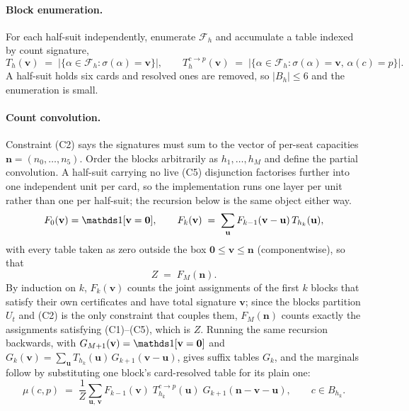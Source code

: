 \paragraph{Block enumeration.} For each half-suit independently, enumerate $\mathcal{F}_h$
and accumulate a table indexed by count signature,
\begin{equation}
  T_h(\mathbf{v}) \;=\; \bigl|\{\alpha \in \mathcal{F}_h : \sigma(\alpha) = \mathbf{v}\}\bigr|,
  \qquad
  T_h^{c \to p}(\mathbf{v}) \;=\; \bigl|\{\alpha \in \mathcal{F}_h : \sigma(\alpha) = \mathbf{v},\,
  \alpha(c) = p\}\bigr|.
  \label{eq:blocktable}
\end{equation}
A half-suit holds six cards and resolved ones are removed, so $|B_h| \le 6$ and the enumeration is
small.

\paragraph{Count convolution.} Constraint (C2) says the signatures must sum to the vector of
per-seat capacities $\mathbf{n} = (n_0,\dots,n_5)$. Order the blocks arbitrarily as $h_1, \dots,
h_M$ and define the partial convolution. A half-suit carrying no live (C5) disjunction factorises
further into one independent unit per card, so the implementation runs one layer per unit rather
than one per half-suit; the recursion below is the same object either way.
\begin{equation}
  F_0(\mathbf{v}) = \ind[\mathbf{v} = \mathbf{0}], \qquad
  F_k(\mathbf{v}) \;=\; \sum_{\mathbf{u}} F_{k-1}(\mathbf{v}-\mathbf{u})\, T_{h_k}(\mathbf{u}),
  \label{eq:dp}
\end{equation}
with every table taken as zero outside the box $\mathbf{0} \le \mathbf{v} \le \mathbf{n}$
(componentwise), so that
\begin{equation}
  Z \;=\; F_M(\mathbf{n}).
  \label{eq:Z}
\end{equation}
By induction on $k$, $F_k(\mathbf{v})$ counts the joint assignments of the first $k$ blocks that
satisfy their own certificates and have total signature $\mathbf{v}$; since the blocks partition
$U_t$ and (C2) is the only constraint that couples them, $F_M(\mathbf{n})$ counts exactly the
assignments satisfying (C1)--(C5), which is $Z$. Running the same recursion backwards, with
$G_{M+1}(\mathbf{v}) = \ind[\mathbf{v} = \mathbf{0}]$ and $G_k(\mathbf{v}) = \sum_{\mathbf{u}}
T_{h_k}(\mathbf{u})\, G_{k+1}(\mathbf{v}-\mathbf{u})$, gives suffix tables $G_k$, and the marginals
follow by substituting one block's card-resolved table for its plain one:
\begin{equation}
  \mu(c,p) \;=\; \frac{1}{Z}\sum_{\mathbf{u},\,\mathbf{v}}
  F_{k-1}(\mathbf{v})\; T_{h_k}^{c \to p}(\mathbf{u})\; G_{k+1}(\mathbf{n}-\mathbf{v}-\mathbf{u}),
  \qquad c \in B_{h_k}.
  \label{eq:marg}
\end{equation}

